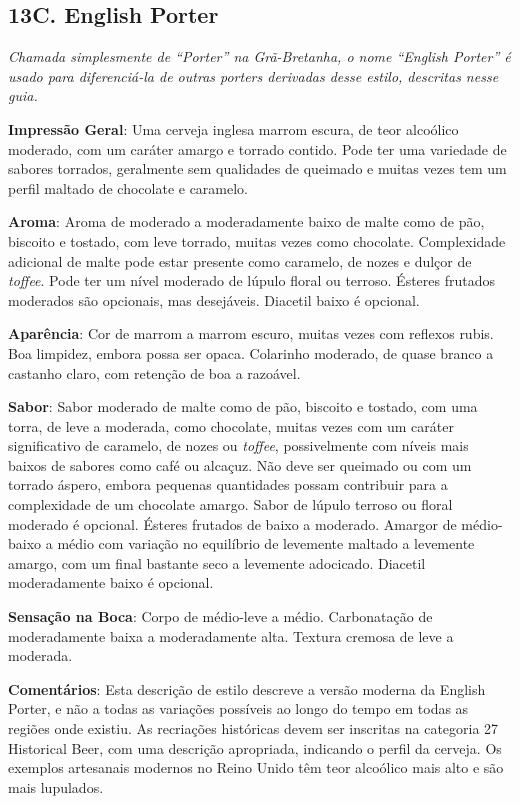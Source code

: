 \subsection*{13C. English Porter}
\textit{Chamada simplesmente de “Porter” na Grã-Bretanha, o nome “English Porter” é usado para diferenciá-la de outras porters derivadas desse estilo, descritas nesse guia.}

\textbf{Impressão Geral}: Uma cerveja inglesa marrom escura, de teor alcoólico moderado, com um caráter amargo e torrado contido. Pode ter uma variedade de sabores torrados, geralmente sem qualidades de queimado e muitas vezes tem um perfil maltado de chocolate e caramelo.

\textbf{Aroma}: Aroma de moderado a moderadamente baixo de malte como de pão, biscoito e tostado, com leve torrado, muitas vezes como chocolate. Complexidade adicional de malte pode estar presente como caramelo, de nozes e dulçor de \textit{toffee}. Pode ter um nível moderado de lúpulo floral ou terroso. Ésteres frutados moderados são opcionais, mas desejáveis. Diacetil baixo é opcional.

\textbf{Aparência}: Cor de marrom a marrom escuro, muitas vezes com reflexos rubis. Boa limpidez, embora possa ser opaca. Colarinho moderado, de quase branco a castanho claro, com retenção de boa a razoável.

\textbf{Sabor}: Sabor moderado de malte como de pão, biscoito e tostado, com uma torra, de leve a moderada, como chocolate, muitas vezes com um caráter significativo de caramelo, de nozes ou \textit{toffee}, possivelmente com níveis mais baixos de sabores como café ou alcaçuz. Não deve ser queimado ou com um torrado áspero, embora pequenas quantidades possam contribuir para a complexidade de um chocolate amargo. Sabor de lúpulo terroso ou floral moderado é opcional. Ésteres frutados de baixo a moderado. Amargor de médio-baixo a médio com variação no equilíbrio de levemente maltado a levemente amargo, com um final bastante seco a levemente adocicado. Diacetil moderadamente baixo é opcional.

\textbf{Sensação na Boca}: Corpo de médio-leve a médio. Carbonatação de moderadamente baixa a moderadamente alta. Textura cremosa de leve a moderada.

\textbf{Comentários}: Esta descrição de estilo descreve a versão moderna da English Porter, e não a todas as variações possíveis ao longo do tempo em todas as regiões onde existiu. As recriações históricas devem ser inscritas na categoria 27 Historical Beer, com uma descrição apropriada, indicando o perfil da cerveja. Os exemplos artesanais modernos no Reino Unido têm teor alcoólico mais alto e são mais lupulados.

